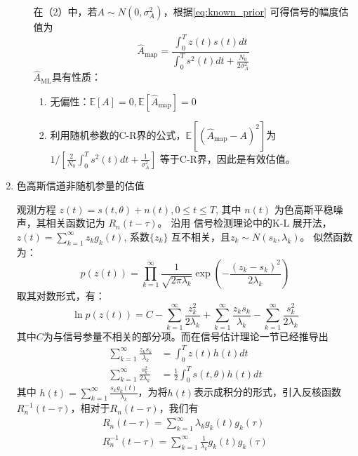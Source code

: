 \documentclass{article}
\def\E{\mathbb{E}}
\begin{document}
\begin{enumerate}
\begin{enumerate}[label=(\arabic*)]
在（2）中，若$A \sim N(0,\sigma_A^2)$，根据\eqref{eq:known_prior} 可得信号的幅度估值为 
$$
\hat{A}_{\mathrm{map}} = \frac{\int_0^T z(t)s(t)dt}{\int_0^T s^2(t)dt+\frac{N_0}{2\sigma_A^2}}
$$
$\hat{A}_{\mathrm{ML}}$具有性质：
\begin{enumerate}[label=(\alph*)]
\item 无偏性：$\E[A]=0,\E[\hat{A}_{\mathrm{map}}]=0$
\item 利用随机参数的C-R界的公式，$\E[(\hat{A}_{\mathrm{map}}-A)^2]$为$1/[\frac{2}{N_0}\int_0^T s^2(t)dt+\frac{1}{\sigma_A^2}]$ 等于C-R界，因此是有效估值。
\end{enumerate}
\end{enumerate}
\item 色高斯信道非随机参量的估值

观测方程 $z(t) = s(t,\theta) + n(t),0\leq t \leq T$, 其中 $n(t)$ 为色高斯平稳噪声，其相关函数记为 $R_n(t-\tau)$。
沿用 信号检测理论中的K-L 展开法，$z(t)=\sum_{k=1}^{\infty} z_k g_k(t)$, 系数$\{z_k\}$ 互不相关，且$z_k\sim N(s_k,\lambda_k)$。
似然函数为：
$$
p(z(t)) = \prod_{k=1}^{\infty} \frac{1}{\sqrt{2\pi \lambda_k}} \exp\left(-\frac{(z_k-s_k)^2}{2\lambda_k}\right)
$$
取其对数形式，有：
\begin{equation}\label{eq:midpz}
\ln p(z(t)) = C - \sum_{k=1}^{\infty} \frac{z_k^2}{2\lambda_k} + \sum_{k=1}^{\infty} \frac{z_k s_k}{\lambda_k} - \sum_{k=1}^{\infty}\frac{s_k^2}{2\lambda_k}
\end{equation}
其中$C$为与信号参量不相关的部分项。而在信号估计理论一节已经推导出
\begin{subequations}
\begin{align}
\label{eq:zs} \sum_{k=1}^{\infty} \frac{z_k s_k}{\lambda_k} & = \int_0^T z(t)h(t)dt \\
\label{eq:ss} \sum_{k=1}^{\infty}\frac{s_k^2}{2\lambda_k} & = \frac{1}{2} \int_0^T s(t,\theta)h(t)dt
\end{align}
\end{subequations}
其中
$h(t)=\displaystyle\sum_{k=1}^{\infty}\frac{s_k g_k(t)}{\lambda_k}$，为将$h(t)$表示成积分的形式，引入反核函数
$R_n^{-1}(t-\tau)$，相对于$R_n(t-\tau)$，我们有
\begin{subequations}
\begin{align}
\label{eq:idn} R_n(t-\tau) = \sum_{k=1}^{\infty} \lambda_k g_k(t)g_k(\tau) \\
\label{eq:inv} R_n^{-1}(t-\tau) = \sum_{k=1}^{\infty} \frac{1}{\lambda_k} g_k(t)g_k(\tau)
\end{align}
\end{subequations}

\end{enumerate}
\end{document}
